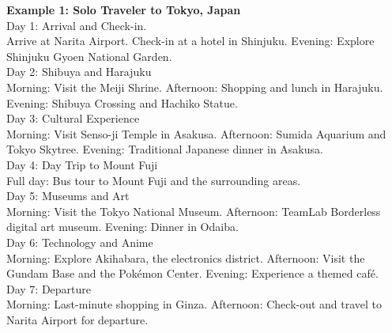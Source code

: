 \documentclass[12pt,ngerman]{AssignmentClass}
\begin{document}
\begin{enumerate}[a)]
            \textbf{Example 1: Solo Traveler to Tokyo, Japan}\\
            Day 1: Arrival and Check-in.\\
            Arrive at Narita Airport. Check-in at a hotel in Shinjuku. Evening: Explore Shinjuku Gyoen National Garden.\\
            Day 2: Shibuya and Harajuku\\
            Morning: Visit the Meiji Shrine. Afternoon: Shopping and lunch in Harajuku. Evening: Shibuya Crossing and Hachiko Statue.\\
            Day 3: Cultural Experience\\
            Morning: Visit Senso-ji Temple in Asakusa. Afternoon: Sumida Aquarium and Tokyo Skytree. Evening: Traditional Japanese dinner in Asakusa.\\
            Day 4: Day Trip to Mount Fuji\\
            Full day: Bus tour to Mount Fuji and the surrounding areas.\\
            Day 5: Museums and Art\\
            Morning: Visit the Tokyo National Museum. Afternoon: TeamLab Borderless digital art museum. Evening: Dinner in Odaiba.\\
            Day 6: Technology and Anime\\
            Morning: Explore Akihabara, the electronics district. Afternoon: Visit the Gundam Base and the Pokémon Center. Evening: Experience a themed café.\\
            Day 7: Departure\\
            Morning: Last-minute shopping in Ginza. Afternoon: Check-out and travel to Narita Airport for departure.\\
            

\end{enumerate}
\end{document}
